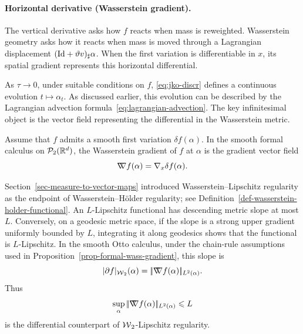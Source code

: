 \paragraph{Horizontal derivative (Wasserstein gradient).}

The vertical derivative asks how \(f\) reacts when mass is reweighted. Wasserstein geometry asks how it reacts when mass is moved through a Lagrangian displacement \((\mathrm{Id}+\vartheta v)_\sharp\alpha\). When the first variation is differentiable in \(x\), its spatial gradient represents this horizontal differential.

As \(\tau\to0\), under suitable conditions on \(f\), \eqref{eq:jko-discr} defines a continuous evolution \(t\mapsto\alpha_t\). As discussed earlier, this evolution can be described by the Lagrangian advection formula~\eqref{eq:lagrangian-advection}. The key infinitesimal object is the vector field representing the differential in the Wasserstein metric.

\begin{defn}\label{def-wasserstein-gradient}
	Assume that $f$ admits a smooth first variation $\delta f(\alpha)$. In the smooth formal calculus on $\mathcal{P}_2(\mathbb{R}^d)$, the Wasserstein gradient of $f$ at $\alpha$ is the gradient vector field
	\begin{equation*}
	    \mathord{\nabla\mkern-9.3mu\nabla} f(\alpha) = \nabla_x \delta f(\alpha).
	\end{equation*}
\end{defn}

\begin{rem}\label{rem-w2-lipschitz-bounded-gradient}
	Section~\ref{sec-measure-to-vector-maps} introduced Wasserstein--Lipschitz regularity as the endpoint of Wasserstein--H\"older regularity; see Definition~\ref{def-wasserstein-holder-functional}. An \(L\)-Lipschitz functional has descending metric slope at most \(L\). Conversely, on a geodesic metric space, if the slope is a strong upper gradient uniformly bounded by \(L\), integrating it along geodesics shows that the functional is \(L\)-Lipschitz. In the smooth Otto calculus, under the chain-rule assumptions used in Proposition~\ref{prop-formal-wass-gradient}, this slope is
	\[
		|\partial f|_{\operatorname{\mathcal{W}}_2}(\alpha)
		=
		|\!| \mathord{\nabla\mkern-9.3mu\nabla} f(\alpha) |\!|_{L^2(\alpha)}.
	\]
	Thus
	\[
		\sup_{\alpha}|\!| \mathord{\nabla\mkern-9.3mu\nabla} f(\alpha) |\!|_{L^2(\alpha)}\leqslant L
	\]
	is the differential counterpart of \(\operatorname{\mathcal{W}}_2\)-Lipschitz regularity.
\end{rem}

